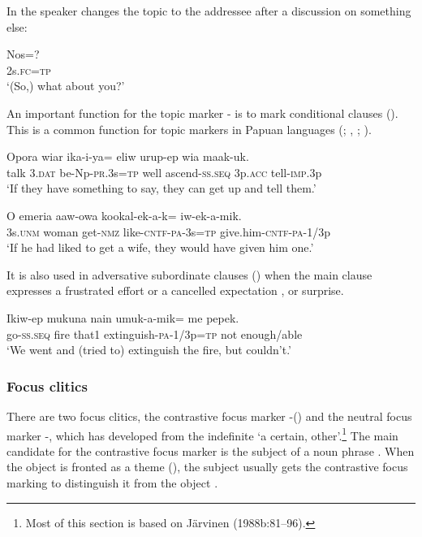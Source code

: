In  the speaker changes the topic to the addressee after a discussion on something else:

\ea%
\label{ex:3:x780}
\gll Nos=? \\
2s.\textsc{fc}=\textsc{tp}\\
\glt`(So,) what about you?'
\z

An important function for the topic marker - is to mark conditional clauses (). This is a common function for topic markers in Papuan languages (\citealt{Haiman1978}; \citealt{Reesink1983b}, \citeyear[242]{Reesink1987}; \citealt[203]{Foley1986}).

\ea%
\label{ex:3:x744}
\gll Opora wiar ika-i-ya= eliw urup-ep wia maak-uk.\\
talk 3.\textsc{dat} be-Np-\textsc{pr}.3s=\textsc{tp} well ascend-\textsc{ss}.\textsc{seq} 3p.\textsc{acc} tell-\textsc{imp}.3p\\
\glt`If they have something to say, they can get up and tell them.'
\z

\ea%
\label{ex:3:x745}
\gll O emeria aaw-owa kookal-ek-a-k= iw-ek-a-mik.\\
3s.\textsc{unm} woman get-\textsc{nmz} like-\textsc{cntf}-\textsc{pa}-3s=\textsc{tp} give.him-\textsc{cntf}-\textsc{pa}-1/3p\\
\glt`If he had liked to get a wife, they would have given him one.'
\z

It is also used in adversative subordinate clauses () when the main clause expresses a frustrated effort or a cancelled expectation , or surprise.

\ea%
\label{ex:3:x1399}
\gll Ikiw-ep mukuna nain umuk-a-mik= me pepek. \\
go-\textsc{ss}.\textsc{seq} fire that1 extinguish-\textsc{pa}-1/3p=\textsc{tp} not enough/able\\
\glt`We went and (tried to) extinguish the fire, but couldn't.'
\z

\subsubsection{Focus clitics}\label{sec:3:z:y:x}
{}
There are two focus clitics, the contrastive focus marker -() and the neutral focus marker -, which has developed from the indefinite  `a certain, other'.\footnote{Most of this section is based on J\"arvinen (1988b:81--96).} The main candidate for the contrastive focus marker is the subject of a noun phrase . When the object is fronted as a theme (), the subject usually gets the contrastive focus marking to distinguish it from the object . 

